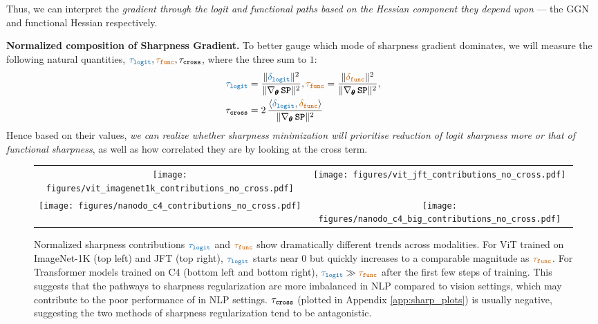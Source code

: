 Thus, we can interpret the
\textit{gradient through the logit and functional paths based on the  Hessian component they depend upon} --- the
GGN and functional Hessian respectively.


\textbf{Normalized composition of Sharpness Gradient.} To better gauge which mode of sharpness gradient dominates, we will measure the following natural quantities, $\lcolor{\tlog}, \fcolor{\tfn}, \tc$, where the three sum to $1$:
\begin{equation}\label{eq:norm-grad-contrib}
\begin{split}
    &\lcolor{\tlog} =  \frac{\|\lcolor{\glog}\|^2}{\|\spcolor{\nabla_\btheta \, \SP}\|^2}, \fcolor{\tfn} = \frac{\|\fcolor{\gfun}\|^2}{\|\spcolor{\nabla_\btheta \, \SP}\|^2},\\
    &\tc = 2\, \frac{\langle\lcolor{\glog}, \fcolor{\gfun}\rangle}{\|\spcolor{\nabla_\btheta \, \SP}\|^2}
    \end{split}
\end{equation}
Hence based on their values, \textit{we can realize whether sharpness minimization will prioritise reduction of logit sharpness more or that of functional sharpness}, as well as how correlated they are by looking at the cross term.


\begin{figure*}[h]
\centering
\begin{tabular}{cc}
\texttt{[image: figures/vit\_imagenet1k\_contributions\_no\_cross.pdf]} \hfill& \texttt{[image: figures/vit\_jft\_contributions\_no\_cross.pdf]} \\
\texttt{[image: figures/nanodo\_c4\_contributions\_no\_cross.pdf]} \hfill& \texttt{[image: figures/nanodo\_c4\_big\_contributions\_no\_cross.pdf]}
\end{tabular}

\caption{Normalized sharpness contributions $\lcolor{\tlog}$ and $\fcolor{\tfn}$ show dramatically different trends across modalities. For ViT trained on ImageNet-1K (top left) and JFT (top right), $\lcolor{\tlog}$ starts near $0$ but quickly increases to a comparable magnitude as $\fcolor{\tfn}$. For Transformer models trained on C4 (bottom left and bottom right), $\lcolor{\tlog}\gg \fcolor{\tfn}$ after the first few steps of training. This suggests that the pathways to sharpness regularization are more imbalanced in NLP compared to vision settings, which may contribute to the poor performance of \SAM in NLP settings. $\tau_{\textbf{\texttt{cross}}}$ (plotted in Appendix \ref{app:sharp_plots}) is usually negative, suggesting the two methods of sharpness regularization tend to be antagonistic.}
\label{fig:sam_contribution_figure}
\end{figure*}


